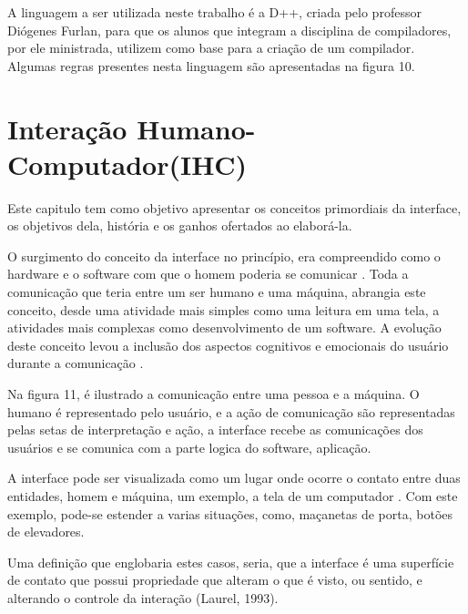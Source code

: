 \documentclass[12pt,oneside,a4paper,chapter=TITLE,section=TITLE,sumario=tradicional]{abntex2}
\begin{document}
A linguagem a ser utilizada neste trabalho é a D++, criada pelo professor Diógenes Furlan, para que os alunos que integram a disciplina de compiladores, por ele ministrada, utilizem como base para a criação de um compilador. Algumas regras presentes nesta linguagem são apresentadas na figura 10.

\begin{figure}[htb]
\end{figure}

\chapter{Interação Humano-Computador(IHC)}
\label{cap:interacao-humano-computador}

Este capitulo tem como objetivo apresentar os conceitos primordiais da interface, os objetivos dela, história e os ganhos ofertados ao elaborá-la. 

O surgimento do conceito da interface no princípio, era compreendido como o hardware e o software com que o homem poderia se comunicar \cite{rocha2003}.  Toda a comunicação que teria entre um ser humano e uma máquina, abrangia este conceito, desde uma atividade mais simples como uma leitura em uma tela, a atividades mais complexas como desenvolvimento de um software. A evolução deste conceito levou a inclusão dos aspectos cognitivos e emocionais do usuário durante a comunicação \cite{rocha2003}.

Na figura 11, é ilustrado a comunicação entre uma pessoa e a máquina. O humano é representado pelo usuário, e a ação de comunicação são representadas pelas setas de interpretação e ação, a interface recebe as comunicações dos usuários e se comunica com a parte logica do software, aplicação.

\begin{figure}[htb]
\end{figure}

A interface pode ser visualizada como um lugar onde ocorre o contato entre duas entidades, homem e máquina, um exemplo, a tela de um computador \cite{rocha2003}. Com este exemplo, pode-se estender a varias situações, como, maçanetas de porta, botões de elevadores.

Uma definição que englobaria estes casos, seria, que a interface é uma superfície de contato que possui propriedade que alteram o que é visto, ou sentido, e alterando o controle da interação (Laurel, 1993).
\end{document}
